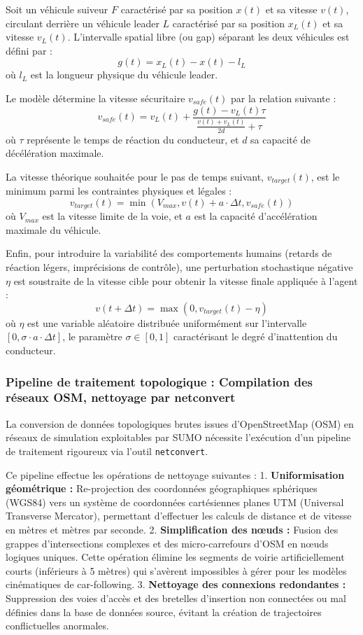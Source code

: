 \documentclass[10pt, a4paper]{article}
\begin{document}
Soit un véhicule suiveur \(F\) caractérisé par sa position \(x(t)\) et
sa vitesse \(v(t)\), circulant derrière un véhicule leader \(L\)
caractérisé par sa position \(x_L(t)\) et sa vitesse \(v_L(t)\).
L'intervalle spatial libre (ou gap) séparant les deux véhicules est
défini par : \[g(t) = x_L(t) - x(t) - l_L\] où \(l_L\) est la longueur
physique du véhicule leader.

Le modèle détermine la vitesse sécuritaire \(v_{safe}(t)\) par la
relation suivante :
\[v_{safe}(t) = v_L(t) + \frac{g(t) - v_L(t)\tau}{\frac{v(t) + v_L(t)}{2d} + \tau}\]
où \(\tau\) représente le temps de réaction du conducteur, et \(d\) sa
capacité de décélération maximale.

La vitesse théorique souhaitée pour le pas de temps suivant,
\(v_{target}(t)\), est le minimum parmi les contraintes physiques et
légales :
\[v_{target}(t) = \min\left( V_{max}, v(t) + a \cdot \Delta t, v_{safe}(t) \right)\]
où \(V_{max}\) est la vitesse limite de la voie, et \(a\) est la
capacité d'accélération maximale du véhicule.

Enfin, pour introduire la variabilité des comportements humains (retards
de réaction légers, imprécisions de contrôle), une perturbation
stochastique négative \(\eta\) est soustraite de la vitesse cible pour
obtenir la vitesse finale appliquée à l'agent :
\[v(t + \Delta t) = \max\left( 0, v_{target}(t) - \eta \right)\] où
\(\eta\) est une variable aléatoire distribuée uniformément sur
l'intervalle \([0, \sigma \cdot a \cdot \Delta t]\), le paramètre
\(\sigma \in [0, 1]\) caractérisant le degré d'inattention du
conducteur.

\subsubsection{Pipeline de traitement topologique : Compilation des
réseaux OSM, nettoyage par
netconvert}\label{pipeline-de-traitement-topologique-compilation-des-ruxe9seaux-osm-nettoyage-par-netconvert}

La conversion de données topologiques brutes issues d'OpenStreetMap
(OSM) en réseaux de simulation exploitables par SUMO nécessite
l'exécution d'un pipeline de traitement rigoureux via l'outil
\texttt{netconvert}.

Ce pipeline effectue les opérations de nettoyage suivantes : 1.
\textbf{Uniformisation géométrique :} Re-projection des coordonnées
géographiques sphériques (WGS84) vers un système de coordonnées
cartésiennes planes UTM (Universal Transverse Mercator), permettant
d'effectuer les calculs de distance et de vitesse en mètres et mètres
par seconde. 2. \textbf{Simplification des nœuds :} Fusion des grappes
d'intersections complexes et des micro-carrefours d'OSM en nœuds
logiques uniques. Cette opération élimine les segments de voirie
artificiellement courts (inférieurs à 5 mètres) qui s'avèrent
impossibles à gérer pour les modèles cinématiques de car-following. 3.
\textbf{Nettoyage des connexions redondantes :} Suppression des voies
d'accès et des bretelles d'insertion non connectées ou mal définies dans
la base de données source, évitant la création de trajectoires
conflictuelles anormales.
\end{document}
